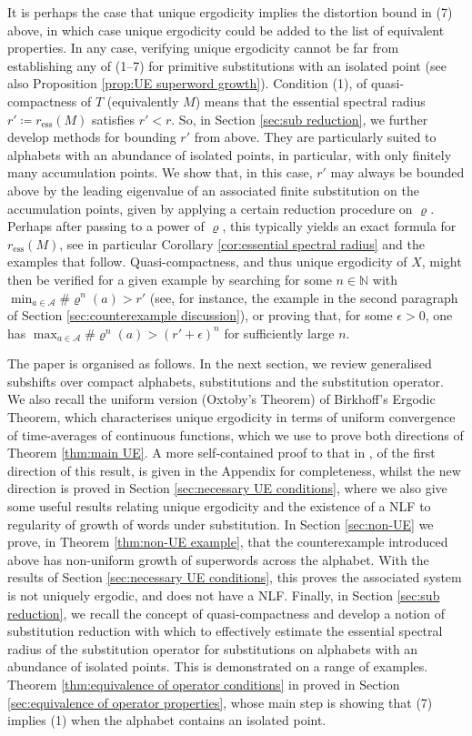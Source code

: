 \documentclass[11pt]{amsart}
\numberwithin{equation}{section}
\theoremstyle{plain}
\theoremstyle{definition}
\newcommand{\N}{{\mathbb N}}
\newcommand{\mc}{\mathcal}
\newcommand{\A}{\mc A}
\newcommand{\sub}{\varrho}
\begin{document}
It is perhaps the case that unique ergodicity implies the distortion bound in (7) above, in which case unique ergodicity could be added to the list of equivalent properties. In any case, verifying unique ergodicity cannot be far from establishing any of (1--7) for primitive substitutions with an isolated point (see also Proposition \ref{prop:UE superword growth}). Condition (1), of quasi-compactness of \(T\) (equivalently \(M\)) means that the essential spectral radius \(r' \coloneqq r_\mathrm{ess}(M)\) satisfies \(r' < r\). So, in Section \ref{sec:sub reduction}, we further develop methods for bounding \(r'\) from above. They are particularly suited to alphabets with an abundance of isolated points, in particular, with only finitely many accumulation points. We show that, in this case, \(r'\) may always be bounded above by the leading eigenvalue of an associated finite substitution on the accumulation points, given by applying a certain reduction procedure on \(\sub\). Perhaps after passing to a power of \(\sub\), this typically yields an exact formula for \(r_\mathrm{ess}(M)\), see in particular Corollary \ref{cor:essential spectral radius} and the examples that follow. Quasi-compactness, and thus unique ergodicity of \(X\), might then be verified for a given example by searching for some \(n \in \N\) with \(\min_{a \in \A} \# \sub^n(a) > r'\) (see, for instance, the example in the second paragraph of Section \ref{sec:counterexample discussion}), or proving that, for some \(\epsilon > 0\), one has \(\max_{a \in \A} \# \sub^n(a)  > (r'+\epsilon)^n\) for sufficiently large \(n\).

The paper is organised as follows. In the next section, we review generalised subshifts over compact alphabets, substitutions and the substitution operator. We also recall the uniform version (Oxtoby's Theorem) of Birkhoff's Ergodic Theorem, which characterises unique ergodicity in terms of uniform convergence of time-averages of continuous functions, which we use to prove both directions of Theorem \ref{thm:main UE}. A more self-contained proof to that in \cite{MRW25}, of the first direction of this result, is given in the Appendix for completeness, whilst the new direction is proved in Section \ref{sec:necessary UE conditions}, where we also give some useful results relating unique ergodicity and the existence of a NLF to regularity of growth of words under substitution. In Section \ref{sec:non-UE} we prove, in Theorem \ref{thm:non-UE example}, that the counterexample introduced above has non-uniform growth of superwords across the alphabet. With the results of Section \ref{sec:necessary UE conditions}, this proves the associated system is not uniquely ergodic, and does not have a NLF. Finally, in Section \ref{sec:sub reduction}, we recall the concept of quasi-compactness and develop a notion of substitution reduction with which to effectively estimate the essential spectral radius of the substitution operator for substitutions on alphabets with an abundance of isolated points. This is demonstrated on a range of examples. Theorem \ref{thm:equivalence of operator conditions} in proved in Section \ref{sec:equivalence of operator properties}, whose main step is showing that (7) implies (1) when the alphabet contains an isolated point.
\end{document}
